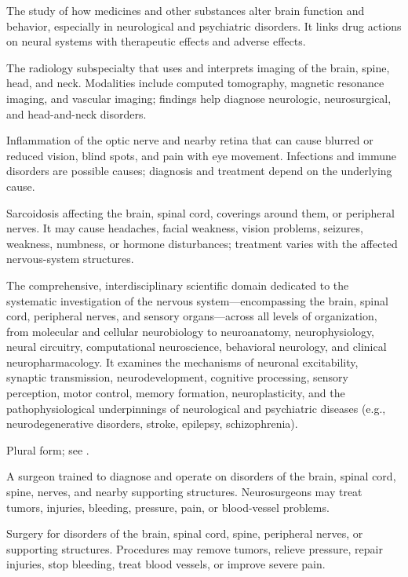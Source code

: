  The study of how medicines and other substances alter brain function and behavior, especially in neurological and psychiatric disorders. It links drug actions on neural systems with therapeutic effects and adverse effects.

 The radiology subspecialty that uses and interprets imaging of the brain,
spine, head, and neck. Modalities include computed tomography, magnetic resonance imaging,
and vascular imaging; findings help diagnose neurologic, neurosurgical, and head-and-neck
disorders.

 Inflammation of the optic nerve and nearby retina that can cause blurred or reduced vision, blind spots, and pain with eye movement. Infections and immune disorders are possible causes; diagnosis and treatment depend on the underlying cause.

 Sarcoidosis affecting the brain, spinal cord, coverings around them, or peripheral nerves. It may cause headaches, facial weakness, vision problems, seizures, weakness, numbness, or hormone disturbances; treatment varies with the affected nervous-system structures.

 The comprehensive, interdisciplinary scientific domain dedicated to the systematic investigation of the nervous system---encompassing the brain, spinal cord, peripheral nerves, and sensory organs---across all levels of organization, from molecular and cellular neurobiology to neuroanatomy, neurophysiology, neural circuitry, computational neuroscience, behavioral neurology, and clinical neuropharmacology. It examines the mechanisms of neuronal excitability, synaptic transmission, neurodevelopment, cognitive processing, sensory perception, motor control, memory formation, neuroplasticity, and the pathophysiological underpinnings of neurological and psychiatric diseases (e.g., neurodegenerative disorders, stroke, epilepsy, schizophrenia).

 Plural form; see .

 A surgeon trained to diagnose and operate on disorders of the brain, spinal cord, spine, nerves, and nearby supporting structures. Neurosurgeons may treat tumors, injuries, bleeding, pressure, pain, or blood-vessel problems.

 Surgery for disorders of the brain, spinal cord, spine, peripheral nerves, or supporting structures. Procedures may remove tumors, relieve pressure, repair injuries, stop bleeding, treat blood vessels, or improve severe pain.

